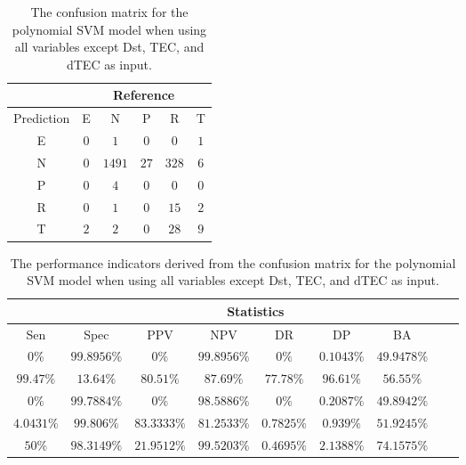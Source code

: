\begin{table}[!ht]
	\centering
	\begin{tabular}{|c|c|c|c|c|c|}
		\hline
		 & \multicolumn{5}{|c|}{Reference} \\ \hline
		 Prediction & E & N & P & R & T \\ \hline
		 E & $0$ & $1$ & $0$ & $0$ & $1$ \\ \hline
		 N & $0$ & $1491$ & $27$ & $328$ & $6$ \\ \hline
		 P & $0$ & $4$ & $0$ & $0$ & $0$ \\ \hline
		 R & $0$ & $1$ & $0$ & $15$ & $2$ \\ \hline
		 T & $2$ & $2$ & $0$ & $28$ & $9$ \\ \hline
	\end{tabular}
	\caption{The confusion matrix for the polynomial SVM model when using all variables except Dst, TEC, and dTEC as input.}
	\label{tab:cm:noTEC:svmPoly}
\end{table}

\begin{table}[!ht]
	\centering
	\begin{tabular}{|c|c|c|c|c|c|c|c|c|}
		\hline
		 & \multicolumn{7}{c|}{Statistics} \\ \hline
		Sen & Spec & PPV & NPV & DR & DP & BA \\ \hline
		$0\%$ & $99.8956\%$ & $0\%$ & $99.8956\%$ & $0\%$ & $0.1043\%$ & $49.9478\%$ \\ \hline
		$99.47\%$ & $13.64\%$ & $80.51\%$ & $87.69\%$ & $77.78\%$ & $96.61\%$ & $56.55\%$ \\ \hline
		$0\%$ & $99.7884\%$ & $0\%$ & $98.5886\%$ & $0\%$ & $0.2087\%$ & $49.8942\%$ \\ \hline
		$4.0431\%$ & $99.806\%$ & $83.3333\%$ & $81.2533\%$ & $0.7825\%$ & $0.939\%$ & $51.9245\%$ \\ \hline
		$50\%$ & $98.3149\%$ & $21.9512\%$ & $99.5203\%$ & $0.4695\%$ & $2.1388\%$ & $74.1575\%$ \\ \hline
	\end{tabular}
	\caption{The performance indicators derived from the confusion matrix for the polynomial SVM model when using all variables except Dst, TEC, and dTEC as input.}
	\label{tab:cs:noTEC:svmPoly}
\end{table}

